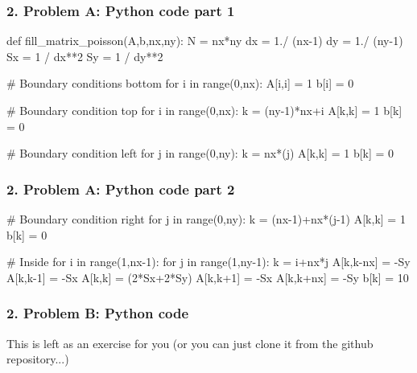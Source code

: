 \begin{frame}[fragile]
	\frametitle{\textbf{2. Problem A: Python code part 1}}


\begin{PYTHON}
def fill_matrix_poisson(A,b,nx,ny):
  N = nx*ny
  dx = 1./ (nx-1)
  dy = 1./ (ny-1)
  Sx = 1 / dx**2
  Sy = 1 / dy**2
  
  # Boundary conditions bottom
  for i in range(0,nx):
    A[i,i] = 1
    b[i] = 0
  
  # Boundary condition top
  for i in range(0,nx):
    k = (ny-1)*nx+i
    A[k,k] = 1
    b[k] = 0
  
  # Boundary condition left
  for j in range(0,ny):
    k = nx*(j)
    A[k,k] = 1
    b[k] = 0

\end{PYTHON}

\end{frame}

\begin{frame}[fragile]
	\frametitle{\textbf{2. Problem A: Python code part 2}}
	
	
	\begin{PYTHON}

# Boundary condition right
for j in range(0,ny):
  k = (nx-1)+nx*(j-1)
  A[k,k] = 1
  b[k] = 0      

# Inside
for i in range(1,nx-1):
  for j in range(1,ny-1):
    k = i+nx*j
    A[k,k-nx] = -Sy
    A[k,k-1] = -Sx
    A[k,k] = (2*Sx+2*Sy)
    A[k,k+1] = -Sx
    A[k,k+nx] = -Sy
    b[k] = 10
\end{PYTHON}
\end{frame}

\begin{frame}[fragile]
	\frametitle{\textbf{2. Problem B: Python code}}
	
	
This is left as an exercise for you (or you can just clone it from the github repository...)
	
\end{frame}


